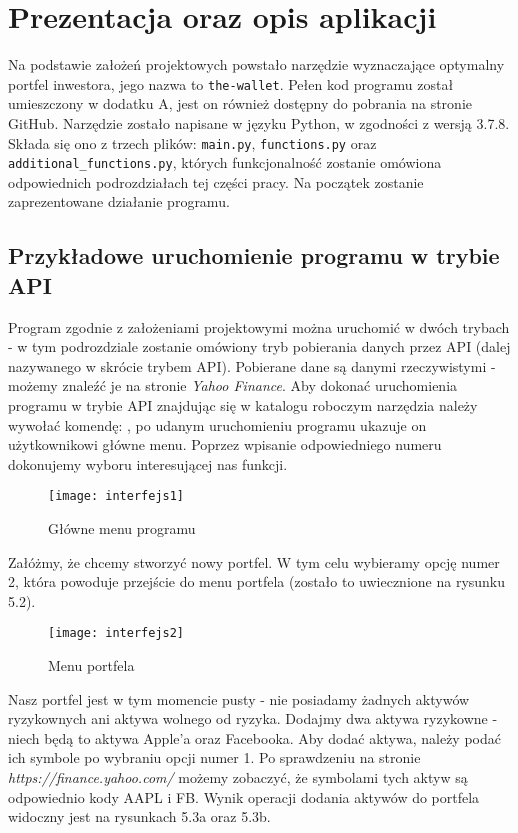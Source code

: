 \documentclass[magister]{dyplom}
\def\code#1{\texttt{#1}}
\begin{document}
\chapter{Prezentacja oraz opis aplikacji}

Na podstawie założeń projektowych powstało narzędzie wyznaczające optymalny portfel inwestora, jego nazwa to \code{the-wallet}. Pełen kod programu został umieszczony w dodatku A, jest on również dostępny do pobrania na stronie GitHub. Narzędzie zostało napisane w języku Python, w zgodności z wersją 3.7.8. Składa się ono z trzech plików: \code{main.py}, \code{functions.py} oraz \code{additional\_functions.py}, których funkcjonalność zostanie omówiona odpowiednich podrozdziałach tej części pracy. Na początek zostanie zaprezentowane działanie programu.

\section{Przykładowe uruchomienie programu w trybie API}

Program zgodnie z założeniami projektowymi można uruchomić w dwóch trybach - w tym podrozdziale zostanie omówiony tryb pobierania danych przez API (dalej nazywanego w skrócie trybem API). Pobierane dane są danymi rzeczywistymi - możemy znaleźć je na stronie \textit{Yahoo Finance}. Aby dokonać uruchomienia programu w trybie API znajdując się w katalogu roboczym narzędzia należy wywołać komendę:
, po udanym uruchomieniu programu ukazuje on użytkownikowi główne menu. Poprzez wpisanie odpowiedniego numeru dokonujemy wyboru interesującej nas funkcji.

\begin{figure}[ht]
	\centering
	\texttt{[image: interfejs1]}
	\caption{Główne menu programu}
\end{figure}
Załóżmy, że chcemy stworzyć nowy portfel. W tym celu wybieramy opcję numer 2, która powoduje przejście do menu portfela (zostało to uwiecznione na rysunku 5.2).
\newpage
\begin{figure}[ht]
	\centering
	\texttt{[image: interfejs2]}
	\caption{Menu portfela}
\end{figure}
Nasz portfel jest w tym momencie pusty - nie posiadamy żadnych aktywów ryzykownych ani aktywa wolnego od ryzyka. Dodajmy dwa aktywa ryzykowne - niech będą to aktywa Apple'a oraz Facebooka. Aby dodać aktywa, należy podać ich symbole po wybraniu opcji numer 1. Po sprawdzeniu na stronie \textit{https://finance.yahoo.com/} możemy zobaczyć, że symbolami tych aktyw są odpowiednio kody AAPL i FB. Wynik operacji dodania aktywów do portfela widoczny jest na rysunkach 5.3a oraz 5.3b.
\end{document}
